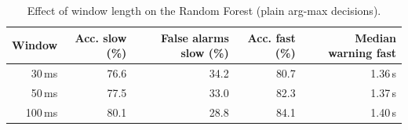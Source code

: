 \begin{table}[H]\centering\small
\caption{Effect of window length on the Random Forest (plain arg-max decisions).}\label{tab:window}
\begin{tabular}{rrrrr}\toprule
Window & Acc. slow (\%) & False alarms slow (\%) & Acc. fast (\%) & Median warning fast \\\midrule
30\,ms & 76.6 & 34.2 & 80.7 & 1.36\,s \\
50\,ms & 77.5 & 33.0 & 82.3 & 1.37\,s \\
100\,ms & 80.1 & 28.8 & 84.1 & 1.40\,s \\
\bottomrule\end{tabular}
\end{table}